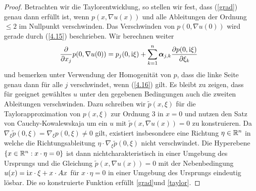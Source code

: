 \begin{proof}
Betrachten wir die Taylorentwicklung, so stellen wir fest, dass (\ref{grad}) genau dann erfüllt ist, wenn $p(x,\nabla u(x))$ und alle Ableitungen der Ordnung $\le 2$ im Nullpunkt verschwinden. Das Verschwinden von $p(0,\nabla u(0))$ wird gerade durch (\ref{4.15}) beschrieben. Wir berechnen weiter
\begin{equation}
\dfrac{\partial}{\partial x_j} p(0,\nabla u(0)) = 
p_j(0,\mathrm i\xi) + \sum_{k=1}^{n} \boldsymbol\alpha_{j,k} \dfrac{\partial p(0,\mathrm i\xi)}{\partial \xi_k}
\end{equation}
und bemerken unter Verwendung der Homogenität von $p$, dass die linke Seite genau dann für alle $j$ verschwindet, wenn (\ref{4.16}) gilt. Es bleibt zu zeigen, dass für geeignet gewähltes $u$ unter den gegebenen Bedingungen auch die zweiten Ableitungen verschwinden. Dazu schreiben wir $\tilde p(x,\xi)$ für die Taylorapproximation von $p(x,\xi)$ zur Ordnung $3$ in $x=0$ und nutzen den Satz von Cauchy-Kowalewskaja um ein $u$ mit $\tilde p(x,\nabla u(x))=0$ zu konstruieren.
Da $\nabla_\xi \tilde p(0,\xi) = \nabla_\xi p(0,\xi)\ne0$ gilt, existiert insbesondere eine Richtung $\eta\in\mathbb R^n$ in welche die Richtungsableitung $\eta\cdot \nabla_\xi \tilde p(0,\xi)$ nicht verschwindet. Die 
Hyperebene $\{ x\in\mathbb R^n : x\cdot\eta = 0\}$ ist dann nichtcharakteristisch in einer Umgebung des Ursprungs und die Gleichung $\tilde p(x,\nabla u(x))=0$ mit der Nebenbedingung $u(x) = \mathrm i x\cdot\xi+x\cdot Ax$ für $x\cdot\eta=0$ in einer Umgebung des Ursprungs eindeutig lösbar. Die so konstruierte Funktion erfüllt \eqref{grad}und \eqref{taylor}.
\end{proof}

